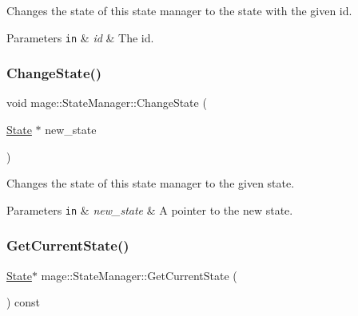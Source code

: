 Changes the state of this state manager to the state with the given id.


\begin{DoxyParams}[1]{Parameters}
\mbox{\tt in}  & {\em id} & The id. \\
\hline
\end{DoxyParams}
\hypertarget{classmage_1_1_state_manager_acb8123a0682394a7b7af001e6c5e25fe}{}\label{classmage_1_1_state_manager_acb8123a0682394a7b7af001e6c5e25fe} 
\subsubsection{\texorpdfstring{Change\+State()}{ChangeState()}\hspace{0.1cm}{\footnotesize\ttfamily [2/2]}}
{\footnotesize\ttfamily void mage\+::\+State\+Manager\+::\+Change\+State (\begin{DoxyParamCaption}\item[{\hyperlink{classmage_1_1_state}{State} $\ast$}]{new\+\_\+state }\end{DoxyParamCaption})\hspace{0.3cm}{\ttfamily [private]}}

Changes the state of this state manager to the given state.


\begin{DoxyParams}[1]{Parameters}
\mbox{\tt in}  & {\em new\+\_\+state} & A pointer to the new state. \\
\hline
\end{DoxyParams}
\hypertarget{classmage_1_1_state_manager_ab3a37b1ef0d2e9960ff4c98747c64d3f}{}\label{classmage_1_1_state_manager_ab3a37b1ef0d2e9960ff4c98747c64d3f} 
\subsubsection{\texorpdfstring{Get\+Current\+State()}{GetCurrentState()}}
{\footnotesize\ttfamily \hyperlink{classmage_1_1_state}{State}$\ast$ mage\+::\+State\+Manager\+::\+Get\+Current\+State (\begin{DoxyParamCaption}{ }\end{DoxyParamCaption}) const}

